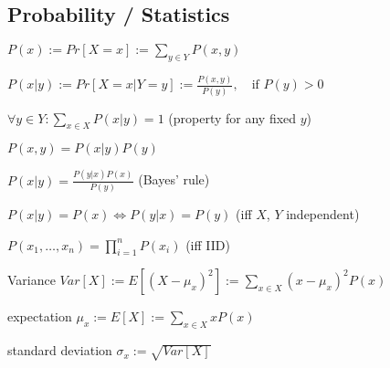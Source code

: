 \subsection*{Probability / Statistics}
\begin{inparaitem}
	\item $P(x) := Pr[X = x] := \sum_{y \in Y} P(x, y)$
	\item $P(x|y) := Pr[X = x | Y = y] := \frac{P(x,y)}{P(y)},\quad \text{if } P(y) > 0$
	\item $\forall y \in Y: \sum_{x \in X} P(x|y) = 1$ (property for any fixed $y$)
	\item $P(x, y) = P(x|y) P(y)$
	\item $P(x|y) = \frac{P(y|x)P(x)}{P(y)}$ (Bayes' rule)
	\item $P(x|y) = P(x) \Leftrightarrow P(y|x) = P(y)$ (iff $X$, $Y$ independent)
	\item $P(x_1, \ldots, x_n) = \prod_{i=1}^n P(x_i)$ (iff IID)
	\item Variance $Var[X]:= E[(X-\mu_x)^2]:=\sum_{x \in X}(x-\mu_x)^2P(x)$
	\item expectation $\mu_x := E[X]:=\sum_{x \in X}xP(x)$
	\item standard deviation $\sigma_x := \sqrt{Var[X]}$
\end{inparaitem}
